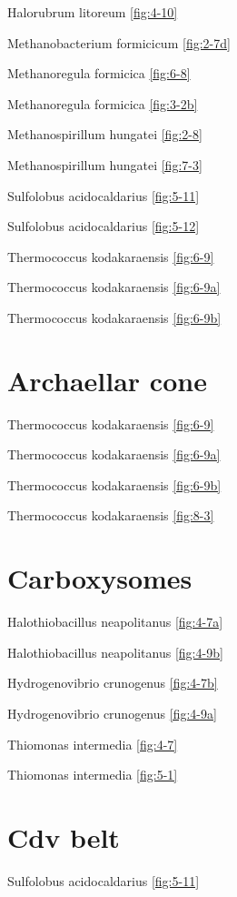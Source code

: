 \documentclass[]{tufte-book}
\begin{document}
Halorubrum litoreum \ref{fig:4-10}

Methanobacterium formicicum \ref{fig:2-7d}

Methanoregula formicica \ref{fig:6-8}

Methanoregula formicica \ref{fig:3-2b}

Methanospirillum hungatei \ref{fig:2-8}

Methanospirillum hungatei \ref{fig:7-3}

Sulfolobus acidocaldarius \ref{fig:5-11}

Sulfolobus acidocaldarius \ref{fig:5-12}

Thermococcus kodakaraensis \ref{fig:6-9}

Thermococcus kodakaraensis \ref{fig:6-9a}

Thermococcus kodakaraensis \ref{fig:6-9b}

\section*{Archaellar cone}\label{archaellar-cone}

Thermococcus kodakaraensis \ref{fig:6-9}

Thermococcus kodakaraensis \ref{fig:6-9a}

Thermococcus kodakaraensis \ref{fig:6-9b}

Thermococcus kodakaraensis \ref{fig:8-3}

\section*{Carboxysomes}\label{carboxysomes}

Halothiobacillus neapolitanus \ref{fig:4-7a}

Halothiobacillus neapolitanus \ref{fig:4-9b}

Hydrogenovibrio crunogenus \ref{fig:4-7b}

Hydrogenovibrio crunogenus \ref{fig:4-9a}

Thiomonas intermedia \ref{fig:4-7}

Thiomonas intermedia \ref{fig:5-1}

\section*{Cdv belt}\label{cdv-belt}

Sulfolobus acidocaldarius \ref{fig:5-11}
\end{document}
